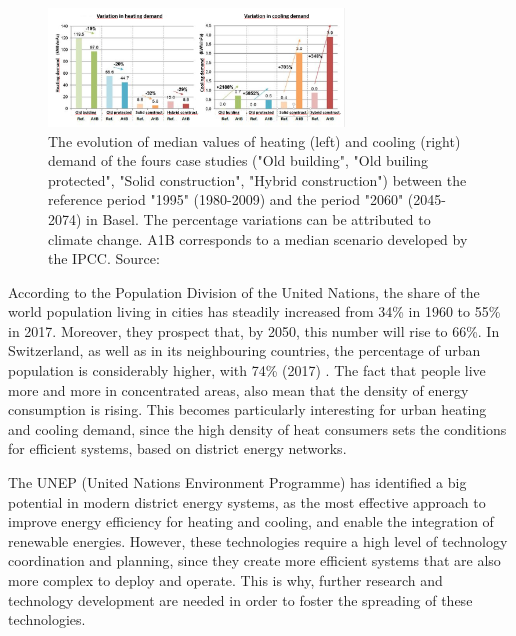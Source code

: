 \documentclass{article}
\begin{document}
\begin{figure}[h!]
	\centering
	\includegraphics[width=0.7\textwidth]{clima_CH.png}
	\caption{The evolution of median values of heating (left) and cooling (right) demand of the fours case studies ("Old building", "Old builing protected", "Solid construction", "Hybrid construction") between the reference period "1995" (1980-2009) and the period "2060" (2045-2074) in Basel. The percentage variations can be attributed to climate change. A1B corresponds to a median scenario developed by the IPCC. Source: \cite{hsluClimaBauPlanenAngesichts2017}}
	\label{fig:climat_CH}
\end{figure}

According to the Population Division of the United Nations, the share of the world population living in cities has steadily increased from 34\% in 1960 to 55\% in 2017. Moreover, they prospect that, by 2050, this number will rise to 66\%. In Switzerland, as well as in its neighbouring countries, the percentage of urban population is considerably higher, with 74\% (2017) \cite{unitednationspopulationdivisionWorldUrbanizationProspects}.
The fact that people live more and more in concentrated areas, also mean that the density of energy consumption is rising. This becomes particularly interesting for urban heating and cooling demand, since the high density of heat consumers sets the conditions for efficient  systems, based on district energy networks. 

The UNEP (United Nations Environment Programme) has identified a big potential in modern district energy systems, as the most effective approach to improve energy efficiency for heating and cooling, and enable the integration of renewable energies. However, these technologies require a high level of technology coordination and planning, since they create more efficient systems that are also more complex to deploy and operate. This is why, further research and technology development are needed in order to foster the spreading of these technologies.

\end{document}
